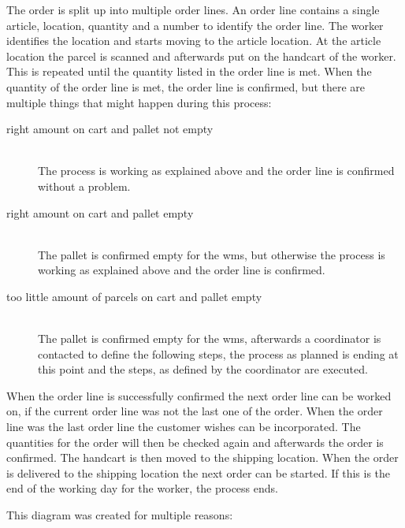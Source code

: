 The order is split up into multiple order lines. An order line contains a single article, location, quantity and a number to identify the order line. The worker identifies the location and starts moving to the article location. At the article location the parcel is scanned and afterwards put on the handcart of the worker. This is repeated until the quantity listed in the order line is met. When the quantity of the order line is met, the order line is confirmed, but there are multiple things that might happen during this process:

\begin{description}
	\item[right amount on cart and pallet not empty] \hfill \\
	The process is working as explained above and the order line is confirmed without a problem.
	\item[right amount on cart and pallet empty] \hfill \\
	The pallet is confirmed empty for the \gls{wms}, but otherwise the process is working as explained above and the order line is confirmed.
	\item[too little amount of parcels on cart and pallet empty] \hfill \\
	The pallet is confirmed empty for the \gls{wms}, afterwards a coordinator is contacted to define the following steps, the process as planned is ending at this point and the steps, as defined by the coordinator are executed.
\end{description}

When the order line is successfully confirmed the next order line can be worked on, if the current order line was not the last one of the order. When the order line was the last order line the customer wishes can be incorporated. The quantities for the order will then be checked again and afterwards the order is confirmed. The handcart is then moved to the shipping location. When the order is delivered to the shipping location the next order can be started. If this is the end of the working day for the worker, the process ends.


This diagram was created for multiple reasons:

